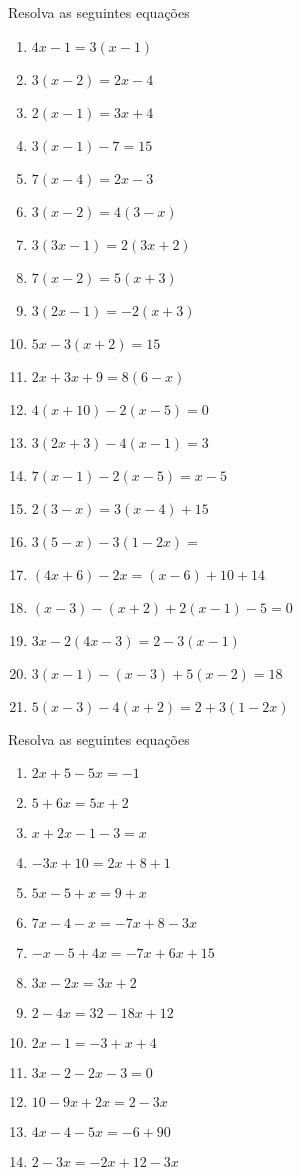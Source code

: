 \item Resolva as seguintes equações
\begin{multicols}{2}				
\begin{enumerate}					
	\item $4x - 1 = 3 ( x - 1)$
	\item $3( x - 2) = 2x - 4$
	\item $2( x - 1) = 3x + 4$
	\item $3(x - 1) - 7 = 15$
	\item $7 ( x - 4) = 2x - 3$
	\item $3 ( x -2) = 4(3 - x)$
	\item $3 ( 3x - 1) = 2 ( 3x + 2)$
	\item $7 ( x - 2 ) = 5 ( x + 3 )$
	\item $3 (2x - 1) = -2 ( x + 3)$
	\item $5x - 3( x +2) = 15$
	\item $2x + 3x + 9 = 8(6 -x)$
	\item $4(x+ 10) -2(x - 5) = 0$
	\item $3 (2x + 3 ) - 4 (x -1) = 3$
	\item $7 (x - 1) - 2 ( x- 5) = x - 5$
	\item $2 (3 - x ) = 3 ( x -4) + 15$
	\item $3 ( 5 - x ) - 3 ( 1 - 2x) =$
	\item $( 4x + 6) - 2x = (x - 6) + 10 +14$
	\item $( x - 3) - ( x + 2) + 2( x - 1) - 5 = 0$
	\item $3x -2 ( 4x - 3 ) = 2 - 3( x - 1)$
	\item $3( x- 1) - ( x - 3) + 5 ( x - 2) = 18$
	\item $5( x - 3 ) - 4 ( x + 2 ) = 2 + 3( 1 - 2x)$
\end{enumerate}	
\end{multicols}

\item Resolva as seguintes equações
\begin{multicols}{2}				
\begin{enumerate}					
	\item $2x + 5 - 5x = -1$
	\item $5 + 6x = 5x + 2$
	\item $x + 2x - 1 - 3 = x$
	\item $-3x + 10 = 2x + 8 +1$
	\item $5x - 5 + x = 9 + x$
	\item $7x - 4 - x = -7x + 8 - 3x$
	\item $-x -5 + 4x = -7x + 6x + 15$
	\item $3x - 2x = 3x + 2$
	\item $2 - 4x = 32 - 18x + 12$
	\item $2x - 1 = -3 + x + 4$
	\item $3x - 2 - 2x - 3 = 0$
	\item $10 - 9x + 2x = 2 - 3x$
	\item $4x - 4 - 5x = -6 + 90$
	\item $2 - 3x = -2x + 12 - 3x$
\end{enumerate}	
\end{multicols}

